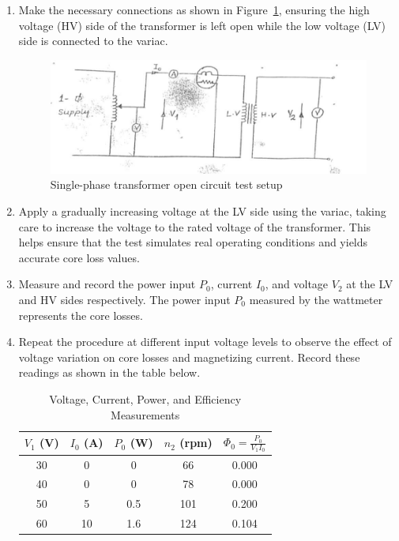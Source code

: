 \documentclass[12pt,a4paper]{report}
\begin{document}
\begin{enumerate}
    \item Make the necessary connections as shown in Figure~\ref{fig_3}, ensuring the high voltage (HV) side of the transformer is left open while the low voltage (LV) side is connected to the variac.

    \begin{figure}[H]
        \centering
        \includegraphics[width=0.8\linewidth]{figure_3_3.jpeg}
        \caption{Single-phase transformer open circuit test setup}
        \label{fig_3}
    \end{figure}

    \item Apply a gradually increasing voltage at the LV side using the variac, taking care to increase the voltage to the rated voltage of the transformer. This helps ensure that the test simulates real operating conditions and yields accurate core loss values.
    
    \item Measure and record the power input \( P_0 \), current \( I_0 \), and voltage \( V_2 \) at the LV and HV sides respectively. The power input \( P_0 \) measured by the wattmeter represents the core losses.
    
    \item Repeat the procedure at different input voltage levels to observe the effect of voltage variation on core losses and magnetizing current. Record these readings as shown in the table below.

    \begin{table}[H]
        \centering
        \caption{Voltage, Current, Power, and Efficiency Measurements}
        \begin{tabular}{|c|c|c|c|c|}
        \hline
        $V_1$ (V) & $I_0$ (A) & $P_0$ (W) & $n_2$ (rpm) & $\Phi_0 = \frac{P_0}{V_1 I_0}$ \\ \hline
        30        & 0         & 0         & 66          & 0.000                          \\ \hline
        40        & 0         & 0         & 78          & 0.000                          \\ \hline
        50        & 5         & 0.5       & 101         & 0.200                          \\ \hline
        60        & 10        & 1.6       & 124         & 0.104                          \\ \hline
        \end{tabular}
        \end{table}
        


\end{enumerate}
\end{document}
